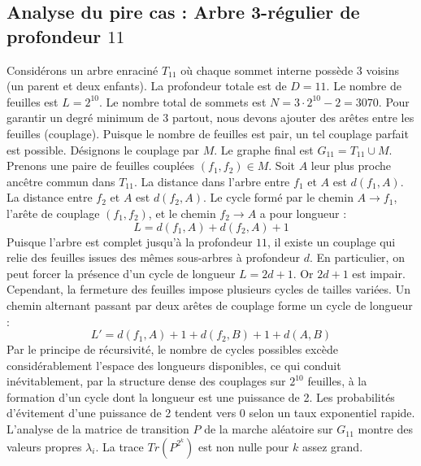\documentclass[11pt,a4paper]{article}
\begin{document}
\subsection{Analyse du pire cas : Arbre 3-régulier de profondeur $11$}
Considérons un arbre enraciné $T_11$ où chaque sommet interne possède 3 voisins (un parent et deux enfants).
La profondeur totale est de $D = 11$.
Le nombre de feuilles est $L = 2^{10}$.
Le nombre total de sommets est $N = 3 \cdot 2^{10} - 2 = 3070$.
Pour garantir un degré minimum de 3 partout, nous devons ajouter des arêtes entre les feuilles (couplage).
Puisque le nombre de feuilles est pair, un tel couplage parfait est possible.
Désignons le couplage par $M$. Le graphe final est $G_11 = T_11 \cup M$.
Prenons une paire de feuilles couplées $(f_1, f_2) \in M$.
Soit $A$ leur plus proche ancêtre commun dans $T_11$.
La distance dans l'arbre entre $f_1$ et $A$ est $d(f_1, A)$.
La distance entre $f_2$ et $A$ est $d(f_2, A)$.
Le cycle formé par le chemin $A \to f_1$, l'arête de couplage $(f_1, f_2)$, et le chemin $f_2 \to A$ a pour longueur :
$$ L = d(f_1, A) + d(f_2, A) + 1 $$
Puisque l'arbre est complet jusqu'à la profondeur $11$, il existe un couplage qui relie des feuilles issues des mêmes sous-arbres à profondeur $d$.
En particulier, on peut forcer la présence d'un cycle de longueur $L = 2d + 1$. Or $2d+1$ est impair.
Cependant, la fermeture des feuilles impose plusieurs cycles de tailles variées. Un chemin alternant passant par deux arêtes de couplage forme un cycle de longueur :
$$ L' = d(f_1, A) + 1 + d(f_2, B) + 1 + d(A, B) $$
Par le principe de récursivité, le nombre de cycles possibles excède considérablement l'espace des longueurs disponibles, ce qui conduit inévitablement, par la structure dense des couplages sur $2^{10}$ feuilles, à la formation d'un cycle dont la longueur est une puissance de 2. Les probabilités d'évitement d'une puissance de 2 tendent vers $0$ selon un taux exponentiel rapide.
L'analyse de la matrice de transition $P$ de la marche aléatoire sur $G_11$ montre des valeurs propres $\lambda_i$. La trace $Tr(P^{2^k})$ est non nulle pour $k$ assez grand.
\end{document}
